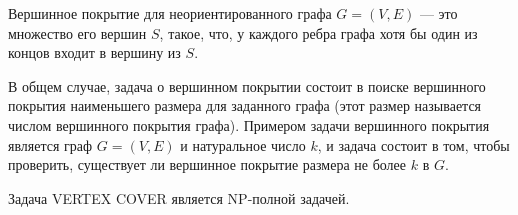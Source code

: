     \begin{Def}
    Вершинное покрытие для неориентированного графа $G=(V,E)$ --- это множество его вершин $S$, такое, что, у каждого ребра графа хотя бы один из концов входит в вершину из $S$.
    \end{Def}
    \begin{Def}
    В общем случае, задача о вершинном покрытии состоит в поиске вершинного покрытия наименьшего размера для заданного графа (этот размер называется числом вершинного покрытия графа). Примером задачи вершинного покрытия является граф $G=(V, E)$ и натуральное число $k$, и задача состоит в том, чтобы проверить, существует ли вершинное покрытие размера не более $k$ в $G$.
    \end{Def}
    \begin{Thm}
        Задача VERTEX COVER является NP-полной задачей.
    \end{Thm}
